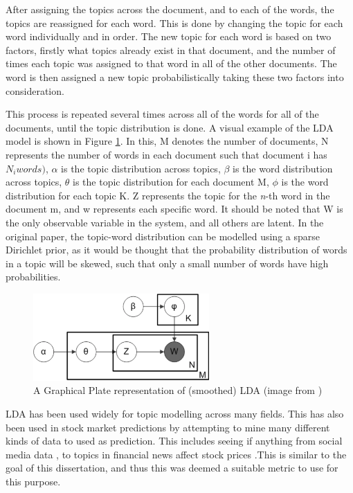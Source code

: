 \noindent After assigning the topics across the document, and to each of the words, the topics are reassigned for each word. This is done by changing the topic for each word individually and in order. The new topic for each word is based on two factors, firstly what topics already exist in that document, and the number of times each topic was assigned to that word in all of the other documents. The word is then assigned a new topic probabilistically taking these two factors into consideration.

\noindent This process is repeated several times across all of the words for all of the documents, until the topic distribution is done. A visual example of the LDA model is shown in Figure \ref{fig:ldafigure}. In this, M denotes the number of documents,
N represents the number of words in each document such that document i has $N_{i} words)$, $\alpha$ is the topic distribution across topics, $\beta$ is the word distribution across topics, $\theta$ is the topic distribution for each document M, $\phi$ is the word distribution for each topic K. Z represents the topic for the \textit{n}-th word in the document m, and w represents each specific word. It should be noted that W is the only observable variable in the system, and all others are latent. In the original paper, the topic-word distribution can be modelled using a sparse Dirichlet prior, as it would be thought that the probability distribution of words in a topic will be skewed, such that only a small number of words have high probabilities. 

\begin{figure}
	\centering
		\includegraphics[width=0.6\textwidth]{images/LDA.png}
	\caption{A Graphical Plate representation of (smoothed) LDA (image from \cite{LDA})}
	\label{fig:ldafigure}
\end{figure}


LDA has been used widely for topic modelling across many fields.  This has also been used in stock market predictions by attempting to mine many different kinds of data to used as prediction. This includes seeing if anything from social media data \cite{nguyen2015sentiment}, to topics in financial news \cite{feuerriegel2016analysis} affect stock prices .This is similar to the goal of this dissertation, and thus this was deemed a suitable metric to use for this purpose. 
 
